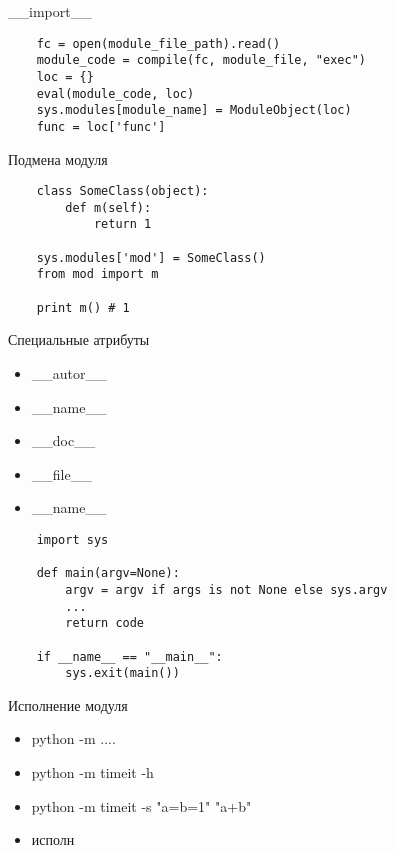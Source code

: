 \documentclass{article}
\begin{document}
\begin{center} \_\_import\_\_ \end{center}
\begin{lstlisting}
    fc = open(module_file_path).read()
    module_code = compile(fc, module_file, "exec")
    loc = {}
    eval(module_code, loc)
    sys.modules[module_name] = ModuleObject(loc)
    func = loc['func']
\end{lstlisting}
\newpage

\begin{center} Подмена модуля \end{center}
\begin{lstlisting}
    class SomeClass(object):
        def m(self):
            return 1

    sys.modules['mod'] = SomeClass()
    from mod import m

    print m() # 1
\end{lstlisting}
\newpage

\begin{center} Специальные атрибуты \end{center}
\begin{itemize}
    \item \_\_autor\_\_
    \item \_\_name\_\_
    \item \_\_doc\_\_
    \item \_\_file\_\_
    \item \_\_name\_\_
\end{itemize}

\begin{lstlisting}
    import sys

    def main(argv=None):
        argv = argv if args is not None else sys.argv
        ...
        return code

    if __name__ == "__main__":
        sys.exit(main())
\end{lstlisting}
\newpage

\begin{center} Исполнение модуля \end{center}
\begin{itemize}
    \item python -m ....
    \item python -m timeit -h
    \item python -m timeit -s "a=b=1" "a+b"
    \item исполн
\end{itemize}
\newpage

\end{document}
